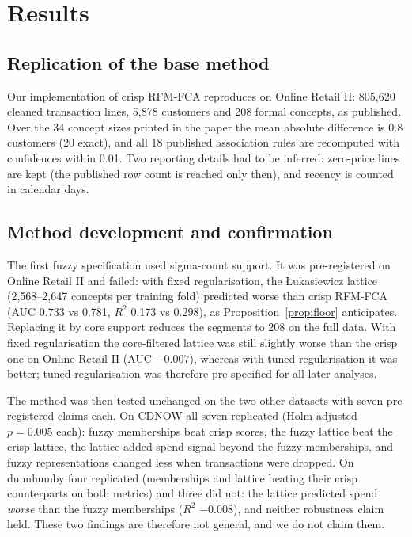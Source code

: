 \section{Results}\label{sec:results}

\subsection{Replication of the base method}\label{sec:res-repl}

Our implementation of crisp RFM-FCA reproduces \citet{rungruang2024} on Online Retail II: 805,620 cleaned transaction lines, 5,878 customers and 208 formal concepts, as published. Over the 34 concept sizes printed in the paper the mean absolute difference is 0.8 customers (20 exact), and all 18 published association rules are recomputed with confidences within 0.01. Two reporting details had to be inferred: zero-price lines are kept (the published row count is reached only then), and recency is counted in calendar days.

\subsection{Method development and confirmation}\label{sec:res-dev}

The first fuzzy specification used sigma-count support. It was pre-registered on Online Retail II and failed: with fixed regularisation, the Łukasiewicz lattice (2,568--2,647 concepts per training fold) predicted worse than crisp RFM-FCA (AUC 0.733 vs 0.781, $R^2$ 0.173 vs 0.298), as Proposition~\ref{prop:floor} anticipates. Replacing it by core support reduces the segments to 208 on the full data. With fixed regularisation the core-filtered lattice was still slightly worse than the crisp one on Online Retail II (AUC $-0.007$), whereas with tuned regularisation it was better; tuned regularisation was therefore pre-specified for all later analyses.

The method was then tested unchanged on the two other datasets with seven pre-registered claims each. On CDNOW all seven replicated (Holm-adjusted $p = 0.005$ each): fuzzy memberships beat crisp scores, the fuzzy lattice beat the crisp lattice, the lattice added spend signal beyond the fuzzy memberships, and fuzzy representations changed less when transactions were dropped. On dunnhumby four replicated (memberships and lattice beating their crisp counterparts on both metrics) and three did not: the lattice predicted spend \emph{worse} than the fuzzy memberships ($R^2$ $-0.008$), and neither robustness claim held. These two findings are therefore not general, and we do not claim them.

